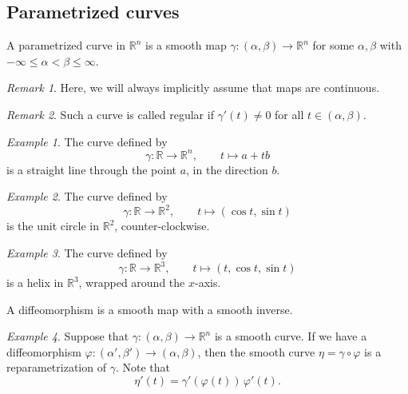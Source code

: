 \documentclass[11pt]{article}
\newcommand{\R}{\mathbb{R}}
\theoremstyle{definition}
\theoremstyle{remark}
\newtheorem*{remark}{Remark}
\newtheorem*{example}{Example}
\numberwithin{equation}{section}
\begin{document}
    
    \subsection{Parametrized curves}
    
    \begin{definition}
        A parametrized curve in $\R^n$ is a smooth map $\gamma\colon (\alpha, \beta)
        \to \R^n$ for some $\alpha, \beta$ with $-\infty \leq \alpha < \beta \leq
        \infty$.
        \begin{remark}
            Here, we will always implicitly assume that maps are continuous.
        \end{remark}
        \begin{remark}
            Such a curve is called regular if $\gamma'(t) \neq 0$ for all $t \in
            (\alpha, \beta)$.
        \end{remark}
    \end{definition}
    \begin{example}
        The curve defined by \[
            \gamma\colon \R \to \R^n, \qquad t \mapsto a + tb
        \] is a straight line through the point $a$, in the direction $b$.
    \end{example}
    \begin{example}
        The curve defined by \[
            \gamma\colon \R \to \R^2, \qquad t \mapsto (\cos{t}, \sin{t})
        \] is the unit circle in $\R^2$, counter-clockwise.
    \end{example}
    \begin{example}
        The curve defined by \[
            \gamma\colon \R \to \R^3, \qquad t \mapsto (t, \cos{t}, \sin{t})
        \] is a helix in $\R^3$, wrapped around the $x$-axis.
    \end{example}

    \begin{definition}
        A diffeomorphism is a smooth map with a smooth inverse.
    \end{definition}

    \begin{example}
        Suppose that $\gamma\colon (\alpha, \beta) \to \R^n$ is a smooth curve. If we
        have a diffeomorphism $\varphi\colon (\alpha', \beta') \to (\alpha, \beta)$,
        then the smooth curve $\eta = \gamma\circ \varphi$ is a reparametrization of
        $\gamma$. Note that \[
            \eta'(t) = \gamma'(\varphi(t))\, \varphi'(t).
        \] 
    \end{example}
\end{document}
